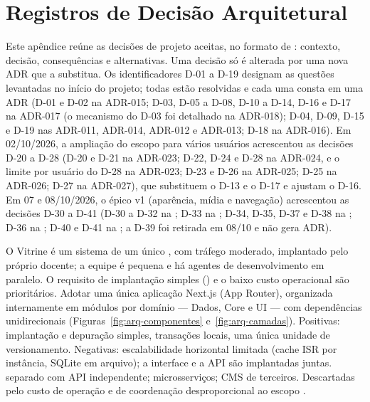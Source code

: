 \chapter{Registros de Decisão Arquitetural}\label{ap:adr}
\begingroup\small

Este apêndice reúne as decisões de projeto aceitas, no formato de  \cite{nygard2011adr}: contexto, decisão, consequências e alternativas. Uma decisão só é alterada por uma nova ADR que a substitua. Os identificadores D-01 a D-19 designam as questões levantadas no início do projeto; todas estão resolvidas e cada uma consta em uma ADR (D-01 e D-02 na ADR-015; D-03, D-05 a D-08, D-10 a D-14, D-16 e D-17 na ADR-017 (o mecanismo do D-03 foi detalhado na ADR-018); D-04, D-09, D-15 e D-19 nas ADR-011, ADR-014, ADR-012 e ADR-013; D-18 na ADR-016). Em 02/10/2026, a ampliação do escopo para vários usuários acrescentou as decisões D-20 a D-28 (D-20 e D-21 na ADR-023; D-22, D-24 e D-28 na ADR-024, e o limite por usuário do D-28 na ADR-023; D-23 e D-26 na ADR-025; D-25 na ADR-026; D-27 na ADR-027), que substituem o D-13 e o D-17 e ajustam o D-16. Em 07 e 08/10/2026, o épico v1 (aparência, mídia e navegação) acrescentou as decisões D-30 a D-41 (D-30 a D-32 na ; D-33 na ; D-34, D-35, D-37 e D-38 na ; D-36 na ; D-40 e D-41 na ; a D-39 foi retirada em 08/10 e não gera ADR).

{O Vitrine é um sistema de um único , com tráfego moderado, implantado pelo próprio docente; a equipe é pequena e há agentes de desenvolvimento em paralelo. O requisito de implantação simples () e o baixo custo operacional são prioritários.}
{Adotar uma única aplicação Next.js (App Router), organizada internamente em módulos por domínio --- Dados, Core e UI --- com dependências unidirecionais (Figuras~\ref{fig:arq-componentes} e~\ref{fig:arq-camadas}).}
{Positivas: implantação e depuração simples, transações locais, uma única unidade de versionamento. Negativas: escalabilidade horizontal limitada (cache ISR por instância, SQLite em arquivo); a interface e a API são implantadas juntas.}
{ separado com API independente; microsserviços; CMS  de terceiros. Descartadas pelo custo de operação e de coordenação desproporcional ao escopo \cite{newman2019monolith,fowler2015monolithfirst}.}

